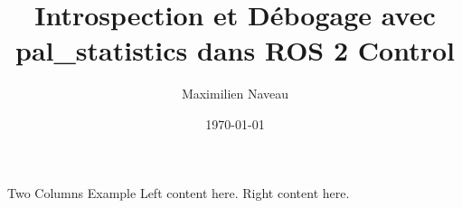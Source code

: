 \documentclass{beamer}
\title{Introspection et Débogage avec pal_statistics dans ROS 2 Control}
\author{Maximilien Naveau}
\date{\today}
\begin{document}
\begin{frame}
\titlepage
\end{frame}


\begin{twocolframe}{Two Columns Example}{
Left content here.
}
Right content here.
\end{twocolframe}


\thankyoupage
\end{document}

